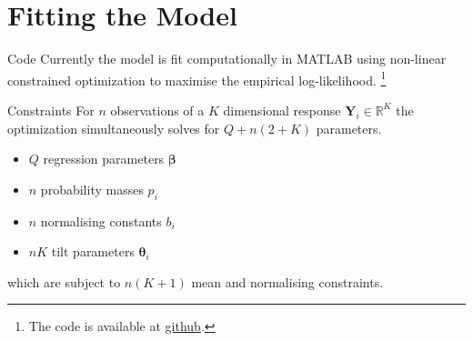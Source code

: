 \documentclass[9pt,notes=hide]{beamer}
\newcommand{\vect}[1]{\boldsymbol #1}
\newcommand{\R}{\mathbb R}
\newcommand{\Var}{\mbox{Var}}
\newcommand{\vbe}{\vect{\beta}}
\newcommand{\Y}{\vect{Y}}
\begin{document}


\section{Fitting the Model}
\begin{frame}{Code}
	Currently the model is fit computationally in MATLAB using
	non-linear constrained  optimization to maximise the empirical log-likelihood.
	\footnote{The code is available at \href{https://github.com/gden173/vspglm}{github}.}
\end{frame}


\begin{frame}{Constraints}
	For $n$ observations of a $K$ dimensional response $\Y_i \in \R^K$ the optimization simultaneously solves for
	$Q + n(2 + K)$ parameters. \pause
	\begin{itemize}[<+->]
		\item  $Q$ regression parameters $\vbe$
		\item  $n$ probability masses $p_i$
		\item  $n$ normalising constants $b_i$
		\item  $nK$ tilt parameters $\vect{\theta}_i$
	\end{itemize}
	\pause[\thebeamerpauses]
	which are subject to $n(K + 1)$ mean and normalising constraints.
\end{frame}
\end{document}
